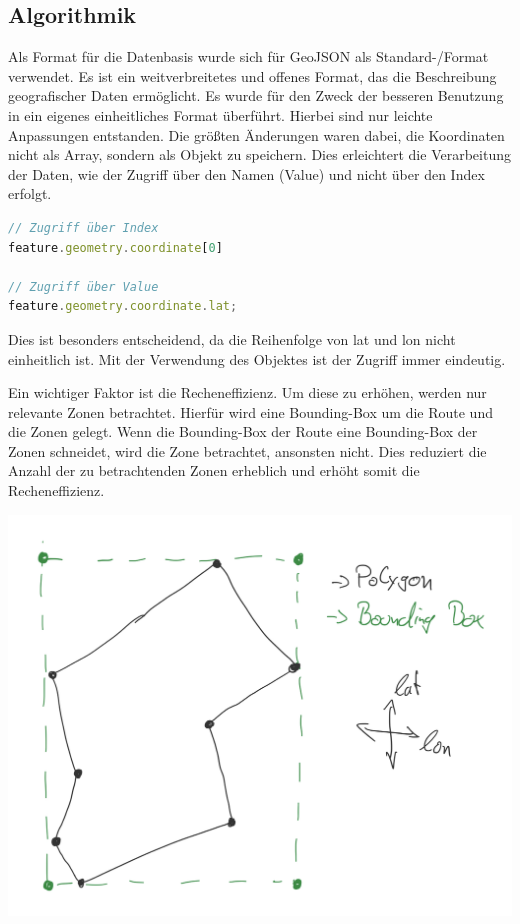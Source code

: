 \subsection*{Algorithmik}

Als Format für die Datenbasis wurde sich für GeoJSON als Standard-/Format \cite{butlerGeoJSONFormat2016} verwendet. Es ist ein weitverbreitetes und offenes Format, das die Beschreibung geografischer Daten ermöglicht. Es wurde für den Zweck der besseren Benutzung in ein eigenes einheitliches Format überführt. Hierbei sind nur leichte Anpassungen entstanden. Die größten Änderungen waren dabei, die Koordinaten nicht als Array, sondern als Objekt zu speichern. Dies erleichtert die Verarbeitung der Daten, wie der Zugriff über den Namen (Value) und nicht über den Index erfolgt.

\begin{lstlisting}[caption={Zugriff über Index oder Value},label={lst:replaceCode}, language=javascript]
// Zugriff über Index
feature.geometry.coordinate[0]

// Zugriff über Value
feature.geometry.coordinate.lat;
\end{lstlisting}


Dies ist besonders entscheidend, da die Reihenfolge von lat und lon nicht einheitlich ist. Mit der Verwendung des Objektes ist der Zugriff immer eindeutig.

Ein wichtiger Faktor ist die Recheneffizienz. Um diese zu erhöhen, werden nur relevante Zonen betrachtet. Hierfür wird eine Bounding-Box um die Route und die Zonen gelegt. Wenn die Bounding-Box der Route eine Bounding-Box der Zonen schneidet, wird die Zone betrachtet, ansonsten nicht. Dies reduziert die Anzahl der zu betrachtenden Zonen erheblich und erhöht somit die Recheneffizienz.

\begin{center}
    \includegraphics[width=\columnwidth]{images/boundingbox}
\end{center}

